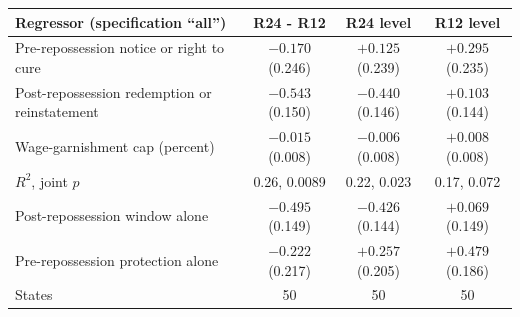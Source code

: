 \begin{tabular}{lccc}
\toprule
Regressor (specification ``all'') & R24 - R12 & R24 level & R12 level \\
\midrule
Pre-repossession notice or right to cure & $-0.170$ (0.246) & $+0.125$ (0.239) & $+0.295$ (0.235) \\
Post-repossession redemption or reinstatement & $-0.543$ (0.150) & $-0.440$ (0.146) & $+0.103$ (0.144) \\
Wage-garnishment cap (percent) & $-0.015$ (0.008) & $-0.006$ (0.008) & $+0.008$ (0.008) \\
\midrule
$R^2$, joint $p$ & 0.26, 0.0089 & 0.22, 0.023 & 0.17, 0.072 \\
Post-repossession window alone & $-0.495$ (0.149) & $-0.426$ (0.144) & $+0.069$ (0.149) \\
Pre-repossession protection alone & $-0.222$ (0.217) & $+0.257$ (0.205) & $+0.479$ (0.186) \\
States & 50 & 50 & 50 \\
\bottomrule
\end{tabular}
